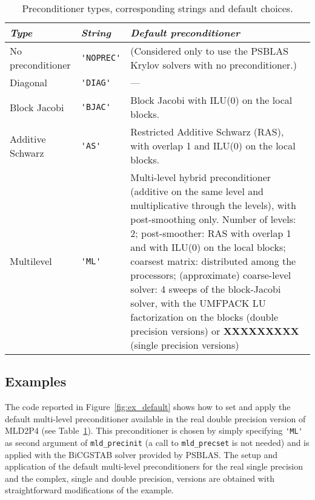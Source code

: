 \begin{table}[th]
{
\begin{center}
\begin{tabular}{|l|l|p{6.7cm}|}
\hline
\emph{Type}       & \emph{String} & \emph{Default preconditioner} \\ \hline
No preconditioner &\verb|'NOPREC'|& (Considered only to use the PSBLAS
                                    Krylov solvers with no preconditioner.) \\
Diagonal          & \verb|'DIAG'| & --- \\
Block Jacobi      & \verb|'BJAC'| & Block Jacobi with ILU(0) on the local blocks.\\ 
Additive Schwarz  & \verb|'AS'|   & Restricted Additive Schwarz (RAS),
                                    with overlap 1 and ILU(0) on the local blocks. \\ 
Multilevel        &\verb|'ML'|    & Multi-level hybrid preconditioner (additive on the
                                    same level and multiplicative through the levels),
                                    with post-smoothing only. Number of levels: 2;
                                    post-smoother: RAS with overlap 1 and with ILU(0)
                                    on the local blocks; coarsest matrix: distributed 
                                    among the processors; (approximate) coarse-level
                                    solver: 4 sweeps of the block-Jacobi solver, 
                                    with the UMFPACK LU factorization
                                    on the blocks (double precision versions) or
                                    \textbf{XXXXXXXXX} (single precision versions)\\
\hline
\end{tabular}
\end{center}
}
\caption{Preconditioner types, corresponding strings and default choices.
\label{tab:precinit}}
\end{table}

\subsection{Examples\label{sec:examples}}

The code reported in Figure~\ref{fig:ex_default} shows how to set and apply the default
multi-level preconditioner available in the real double precision version
of MLD2P4 (see Table~\ref{tab:precinit}). This preconditioner is chosen
by simply specifying \verb|'ML'| as second argument of \verb|mld_precinit|
(a call to \verb|mld_precset| is not needed) and is applied with the BiCGSTAB
solver provided by PSBLAS. The setup and application of the default multi-level
preconditioners for the real single precision and the complex, single and double
precision, versions are obtained with straightforward modifications of the example.
 

